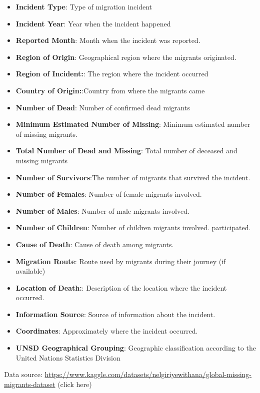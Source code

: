 \documentclass{article}
\begin{document}
\begin{itemize}
    \item \textbf{Incident Type}: Type of migration incident
    \item \textbf{Incident Year}: Year when the incident happened
    \item \textbf{Reported Month}: Month when the incident was reported.
    \item \textbf{Region of Origin}: Geographical region where the migrants originated.
    \item \textbf{Region of Incident:}: The region where the incident occurred
    \item \textbf{Country of Origin:}:Country from where the migrants came
    \item \textbf{Number of Dead}: Number of confirmed dead migrants
    \item \textbf{Minimum Estimated Number of Missing}: Minimum estimated number of missing migrants.
    \item \textbf{Total Number of Dead and Missing}: Total number of deceased and missing migrants
    \item \textbf{Number of Survivors}:The number of migrants that survived the incident.
    \item \textbf{Number of Females}: Number of female migrants involved.
    \item \textbf{Number of Males}: Number of male migrants involved.
    \item \textbf{Number of Children}: Number of children migrants involved.
    participated.
    \item \textbf{Cause of Death}: Cause of death among migrants.
    \item \textbf{Migration Route}: Route used by migrants during their journey (if available)
    \item \textbf{Location of Death:}: Description of the location where the incident occurred.
    \item \textbf{Information Source}: Source of information about the incident.
    \item \textbf{Coordinates}: Approximately where the incident occurred.
    \item \textbf{UNSD Geographical Grouping}: Geographic classification according to the United Nations Statistics Division
    
\end{itemize}


Data source: \url{https://www.kaggle.com/datasets/nelgiriyewithana/global-missing-migrants-dataset} (click here)
\end{document}
